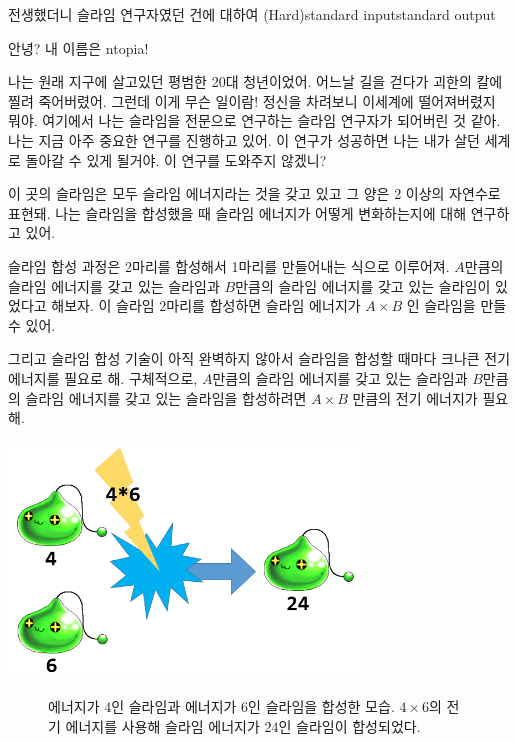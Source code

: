 \begin{problem}{전생했더니 슬라임 연구자였던 건에 대하여 (Hard)}{standard input}{standard output}

안녕? 내 이름은 ntopia!

나는 원래 지구에 살고있던 평범한 20대 청년이었어. 어느날 길을 걷다가 괴한의 칼에 찔려
죽어버렸어. 그런데 이게 무슨 일이람! 정신을 차려보니 이세계에 떨어져버렸지 뭐야.
여기에서 나는 슬라임을 전문으로 연구하는 슬라임 연구자가 되어버린 것 같아.
나는 지금 아주 중요한 연구를 진행하고 있어. 이 연구가 성공하면 나는 내가 살던 세계로
돌아갈 수 있게 될거야. 이 연구를 도와주지 않겠니?

이 곳의 슬라임은 모두 슬라임 에너지라는 것을 갖고 있고 그 양은 2 이상의 자연수로 표현돼.
나는 슬라임을 합성했을 때 슬라임 에너지가 어떻게 변화하는지에 대해 연구하고 있어.

슬라임 합성 과정은 2마리를 합성해서 1마리를 만들어내는 식으로 이루어져.
$A$만큼의 슬라임 에너지를 갖고 있는 슬라임과 $B$만큼의 슬라임 에너지를 갖고 있는
슬라임이 있었다고 해보자. 이 슬라임 2마리를 합성하면
슬라임 에너지가 $A \times B$ 인 슬라임을 만들 수 있어.

그리고 슬라임 합성 기술이 아직 완벽하지 않아서 슬라임을 합성할 때마다
크나큰 전기 에너지를 필요로 해. 구체적으로,
$A$만큼의 슬라임 에너지를 갖고 있는 슬라임과 $B$만큼의 슬라임 에너지를 갖고 있는 슬라임을
합성하려면 $A \times B$ 만큼의 전기 에너지가 필요해.

\begin{center}
  \includegraphics[width=0.7\textwidth]{slime_compose.png}
  \begin{figure}[!h]
  \captionsetup{labelformat=empty,justification=centering}
  \caption{에너지가 $4$인 슬라임과 에너지가 $6$인 슬라임을 합성한 모습. $4\times6$의 전기 에너지를 사용해 슬라임 에너지가 $24$인 슬라임이 합성되었다.}
  \end{figure}
\end{center}


\end{problem}

